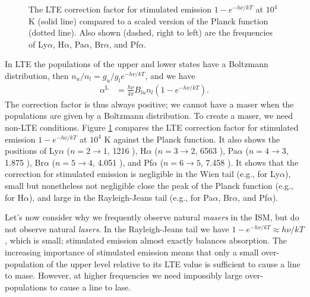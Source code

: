 \begin{figure}
\centering

\caption{The LTE correction factor for stimulated emission $1 -
e^{-h\nu/kT}$ at $10^4$ K (solid line) compared to a scaled
version of the Planck function (dotted line). Also shown (dashed, right to left) are
the frequencies of Ly$\alpha$, H$\alpha$, Pa$\alpha$,
Br$\alpha$, and Pf$\alpha$.}
\label{figure-stimulated-emssion}
\end{figure}

In LTE the populations of the upper and lower states have a
Boltzmann distribution, then $n_u / n_l = g_u/g_l
e^{-h\nu/kT}$, and we have
\begin{align}
\alpha^\mathrm{L} &= \frac{h\nu}{4\pi} B_{lu} n_l 
(1 - e^{-h\nu/kT}).
\end{align}
The correction factor is thus always positive; we cannot
have a maser when the populations are given by a Boltzmann
distribution. To create a maser, we need non-LTE conditions.
Figure \ref{figure-stimulated-emssion} compares the LTE
correction factor for stimulated emission $1 - e^{-h\nu/kT}$
at $10^4$ K against the Planck function. It also shows the
positions of Ly$\alpha$ ($n = 2\rightarrow1$, 1216 {\Angstrom}),
H$\alpha$ ($n=3\rightarrow2$, 6563 {\Angstrom}), Pa$\alpha$
($n=4\rightarrow3$, 1.875 {\micron}), Br$\alpha$ ($n=5\rightarrow4$, 4.051
{\micron}), and Pf$\alpha$ ($n=6\rightarrow5$, 7.458 {\micron}). It
shows that the correction for stimulated emission is
negligible in the Wien tail (e.g., for Ly$\alpha$), small
but nonetheless not negligible close the peak of the Planck
function (e.g., for H$\alpha$), and large in the
Rayleigh-Jeans tail (e.g., for Pa$\alpha$, Br$\alpha$, and
Pf$\alpha$).

Let’s now consider why we frequently observe natural \emph{masers} in the ISM, but do not observe natural \emph{lasers}.
In the Rayleigh-Jeans tail we have $1 - e^{-h\nu/kT} \approx
h\nu/kT$, which is small; stimulated emission almost exactly
balances absorption. The increasing importance of stimulated
emission means that only a small
over-population of the upper level relative to its LTE value
is sufficient to cause a line to mase. However, at higher frequencies we need impossibly large over-populations to cause a line to lase.

